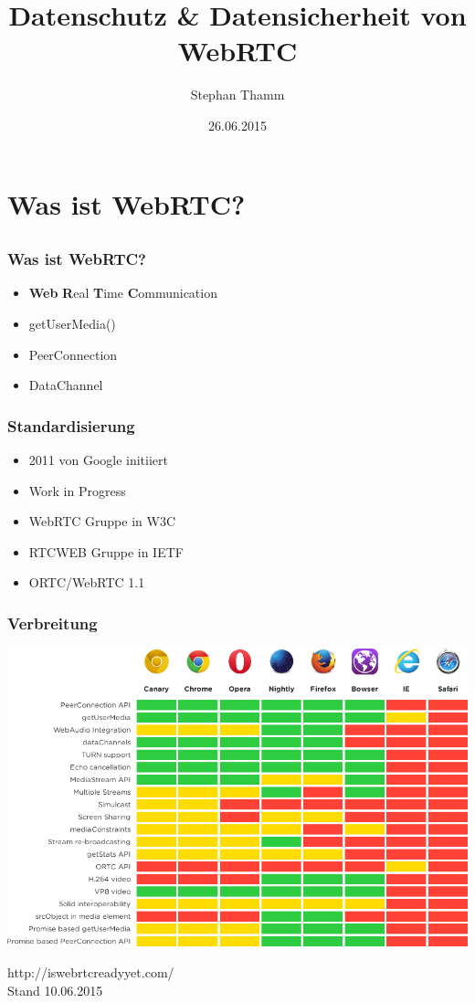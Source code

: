 \documentclass[12pt]{beamer}
\title{\small Datenschutz \& Datensicherheit von \\ \huge WebRTC}
\author{Stephan Thamm}
\date{26.06.2015}
\begin{document}
\maketitle

\frame{\tableofcontents[sections={1-4}]}


\section{Was ist WebRTC?}
\subsection{} 

\begin{frame}
  \frametitle{Was ist WebRTC?}
  \begin{itemize}
    \item<2-> \textbf{Web} \textbf{R}eal \textbf{T}ime \textbf{C}ommunication
    \item<3-> getUserMedia()
    \item<4-> PeerConnection
    \item<5-> DataChannel
  \end{itemize}
\end{frame}

\begin{frame}
  \frametitle{Standardisierung}
  \begin{itemize}
    \item<2-> 2011 von Google initiiert
    \item<3-> Work in Progress
    \item<4-> WebRTC Gruppe in W3C
    \item<5-> RTCWEB Gruppe in IETF
    \item<6-> ORTC/WebRTC 1.1
  \end{itemize}
\end{frame}

\begin{frame}
  \frametitle{Verbreitung}
  \pause
  \centerline{\includegraphics[height=0.7\textheight]{img/webrtc_ready.png}}
  \hfill \tiny http://iswebrtcreadyyet.com/ \\
  \hfill \tiny Stand 10.06.2015
\end{frame}
\end{document}
